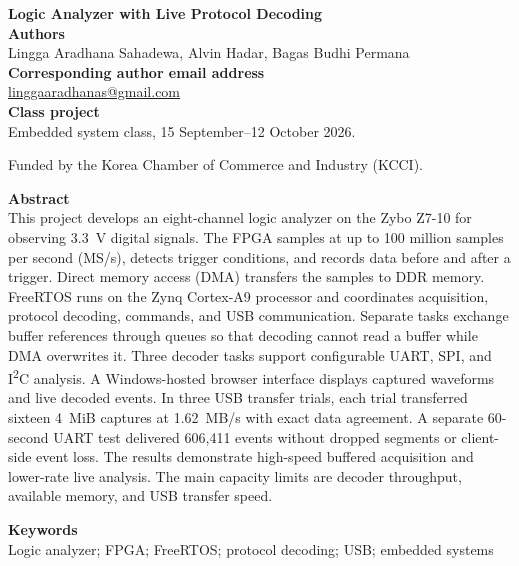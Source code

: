 \documentclass[11pt,a4paper]{article}
\newcommand{\iu}{I\textsuperscript{2}C}
\providecommand{\ReportAuthorNames}{Lingga Aradhana Sahadewa, Alvin Hadar, Bagas Budhi Permana}
\newif\ifFPGA
\begin{document}
\begin{flushleft}
{\LARGE\bfseries Logic Analyzer with Live Protocol Decoding}\\[0.35cm]
\textbf{Authors}\\
\ReportAuthorNames\\[0.25cm]
\textbf{Corresponding author email address}\\
\href{mailto:linggaaradhanas@gmail.com}{linggaaradhanas@gmail.com}\\[0.25cm]
\textbf{Class project}\\
\ifFPGA
FPGA class, 15 September--12 October 2026.
\else
Embedded system class, 15 September--12 October 2026.
\fi
Funded by the Korea Chamber of Commerce and Industry (KCCI).
\end{flushleft}

\vspace{0.2cm}
\textbf{Abstract}\\
This project develops an eight-channel logic analyzer on the Zybo Z7-10 for
observing 3.3~V digital signals. The FPGA samples at up to 100 million samples
per second (MS/s), detects trigger conditions, and records data before and after
a trigger. Direct memory access (DMA) transfers the samples to DDR memory.
FreeRTOS runs on the Zynq Cortex-A9 processor and coordinates acquisition,
protocol decoding, commands, and USB communication. Separate tasks exchange
buffer references through queues so that decoding cannot read a buffer while
DMA overwrites it. Three decoder tasks support configurable UART, SPI, and
\iu{} analysis. A Windows-hosted browser interface displays captured waveforms
and live decoded events. In three USB transfer trials, each trial transferred
sixteen 4~MiB captures at 1.62~MB/s with exact data agreement. A separate
60-second UART test delivered 606,411 events without dropped segments or
client-side event loss. The results demonstrate high-speed buffered acquisition
and lower-rate live analysis. The main capacity limits are decoder throughput,
available memory, and USB transfer speed.

\vspace{0.2cm}
\textbf{Keywords}\\
Logic analyzer; FPGA; FreeRTOS; protocol decoding; USB; embedded systems
\end{document}
